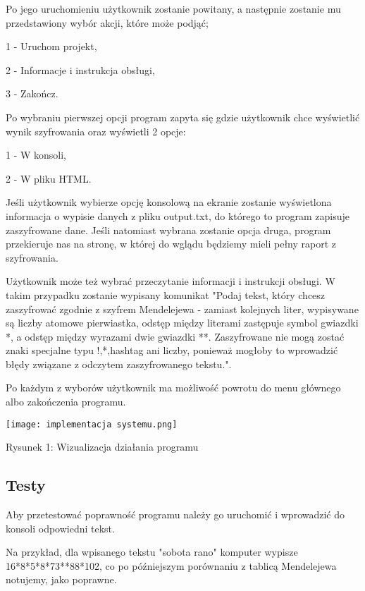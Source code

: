\documentclass[12pt,a4paper]{article}
\begin{document}
        Po jego uruchomieniu użytkownik zostanie powitany, a następnie zostanie mu przedstawiony wybór akcji, które może podjąć;
        
        1 - Uruchom projekt,
        
        2 - Informacje i instrukcja obsługi,
        
        3 - Zakończ.
        
        Po wybraniu pierwszej opcji program zapyta się gdzie użytkownik chce wyświetlić wynik szyfrowania oraz wyświetli 2 opcje:

        1 - W konsoli,

        2 - W pliku HTML.

        Jeśli użytkownik wybierze opcję konsolową na ekranie zostanie wyświetlona informacja o wypisie danych z pliku output.txt, do którego to program zapisuje zaszyfrowane dane. Jeśli natomiast wybrana zostanie opcja druga, program przekieruje nas na stronę, w której do wglądu będziemy mieli pełny raport z szyfrowania.

        Użytkownik może też wybrać przeczytanie informacji i instrukcji obsługi. W takim przypadku zostanie wypisany komunikat "Podaj tekst, który chcesz zaszyfrować zgodnie z szyfrem Mendelejewa - zamiast kolejnych liter, wypisywane są liczby atomowe pierwiastka, odstęp między literami zastępuje symbol gwiazdki *, a odstęp między wyrazami dwie gwiazdki **. Zaszyfrowane nie mogą zostać znaki specjalne typu !,*,hashtag ani liczby, ponieważ mogłoby to wprowadzić błędy związane z odczytem zaszyfrowanego tekstu.".

        Po każdym z wyborów użytkownik ma możliwość powrotu do menu głównego albo zakończenia programu.

        \begin{center}
            \texttt{[image: implementacja systemu.png]}
            
            Rysunek 1: Wizualizacja działania programu
        \end{center}

	\subsection*{Testy}
	\hspace{0.5cm} Aby przetestować poprawność programu należy go        uruchomić i wprowadzić do konsoli odpowiedni tekst.

        Na przykład, dla wpisanego tekstu "sobota rano" komputer wypisze 16*8*5*8*73**88*102, co po późniejszym porównaniu z tablicą Mendelejewa notujemy, jako poprawne.
\end{document}
